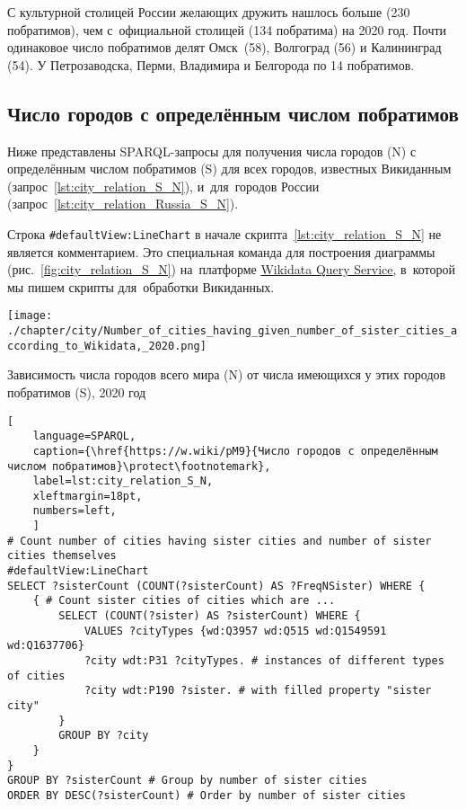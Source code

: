 С культурной столицей России желающих дружить нашлось больше (230 побратимов), 
чем с~официальной столицей (134 побратима) на 2020 год. 
Почти одинаковое число побратимов делят Омск~(58), Волгоград (56) и Калининград (54). 
У Петрозаводска, Перми, Владимира и Белгорода по 14 побратимов.




\subsection{Число городов с определённым числом побратимов}

Ниже представлены SPARQL-запросы для получения числа городов (N) 
с определённым числом побратимов (S) для всех городов, известных Викиданным 
(запрос~\ref{lst:city_relation_S_N}), 
и~для~городов России (запрос~\ref{lst:city_relation_Russia_S_N}).

Строка \lstinline|#defaultView:LineChart| 
в начале скрипта~\ref{lst:city_relation_S_N} не является комментарием. 
Это специальная команда для построения диаграммы (рис.~\ref{fig:city_relation_S_N}) 
на~платформе \href{https://query.wikidata.org}{Wikidata Query Service}, 
в~которой мы пишем скрипты для~обработки Викиданных.

\begin{marginfigure}[22pt]
\texttt{[image: ./chapter/city/Number\_of\_cities\_having\_given\_number\_of\_sister\_cities\_according\_to\_Wikidata,\_2020.png]}%
\caption[Зависимость числа городов от числа имеющихся побратимов, 2020 год.]{Зависимость числа городов всего мира (N) от числа имеющихся у этих городов побратимов (S), 2020 год}%
\label{fig:city_relation_S_N}
\end{marginfigure}

\begin{lstlisting}[ 
    language=SPARQL, 
    caption={\href{https://w.wiki/pM9}{Число городов с определённым числом побратимов}\protect\footnotemark},
    label=lst:city_relation_S_N,
    xleftmargin=18pt, 
    numbers=left,
    ]
# Count number of cities having sister cities and number of sister cities themselves
#defaultView:LineChart
SELECT ?sisterCount (COUNT(?sisterCount) AS ?FreqNSister) WHERE {                                                                         
	{ # Count sister cities of cities which are ...
		SELECT (COUNT(?sister) AS ?sisterCount) WHERE {        
			VALUES ?cityTypes {wd:Q3957 wd:Q515 wd:Q1549591 wd:Q1637706}
			?city wdt:P31 ?cityTypes. # instances of different types of cities
			?city wdt:P190 ?sister. # with filled property "sister city"
		}
		GROUP BY ?city
	}
}
GROUP BY ?sisterCount # Group by number of sister cities                                     
ORDER BY DESC(?sisterCount) # Order by number of sister cities   
\end{lstlisting}
\footnotetext[17][-52pt]{%
Получено: 90 вариантов числа братских городов в мире в 2020 году. Ссылка на~SPARQL-запрос: \href{https://w.wiki/pM9}{https://w.wiki/pM9}.}

